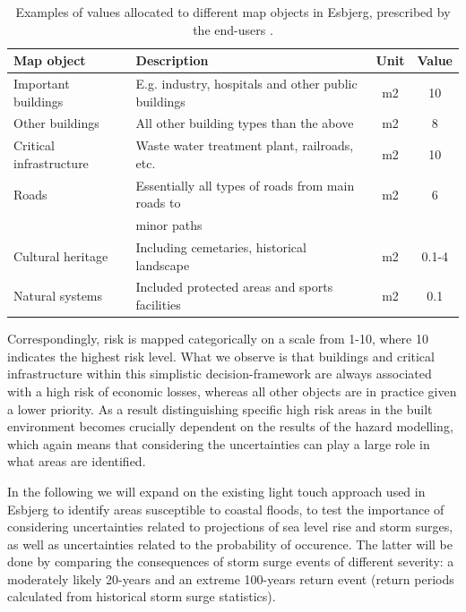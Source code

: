 \documentclass[note,screen,british,11pt]{nrdoc}
\begin{document}
\begin{table}
\begin{center}
\begin{tabular}[]{l | l | c | c }

Map object&Description&Unit&Value\\
\hline
Important buildings & E.g. industry, hospitals and other public buildings & m2 & 10\\
Other buildings & All other building types than the above & m2 & 8\\
Critical infrastructure & Waste water treatment plant, railroads, etc. & m2 & 10\\
Roads & Essentially all types of roads from main roads to & m2 & 6\\
& minor paths & & \\
Cultural heritage & Including cemetaries, historical landscape & m2 & 0.1-4\\
Natural systems & Included protected areas and sports facilities & m2 & 0.1\\
\hline
\end{tabular}
\end{center}
\caption{Examples of values allocated to different map objects in Esbjerg, prescribed by the end-users \citep{Esbjerg2014}.}
\label{tab:valuemap}
\end{table} 

Correspondingly, risk is mapped categorically on a scale from 1-10, where 10 indicates the highest risk level. What we observe is that buildings and critical infrastructure within this simplistic decision-framework are always associated with a high risk of economic losses, whereas all other objects are in practice given a lower priority. As a result distinguishing specific high risk areas in the built environment becomes crucially dependent on the results of the hazard modelling, which again means that considering the uncertainties can play a large role in what areas are identified.

In the following we will expand on the existing light touch approach used in Esbjerg to identify areas susceptible to coastal floods, to test the importance of considering uncertainties related to projections of sea level rise and storm surges, as well as uncertainties related to the probability of occurence. The latter will be done by comparing the consequences of storm surge events of different severity: a moderately likely 20-years and an extreme 100-years return event (return periods calculated from historical storm surge statistics). 
\end{document}
